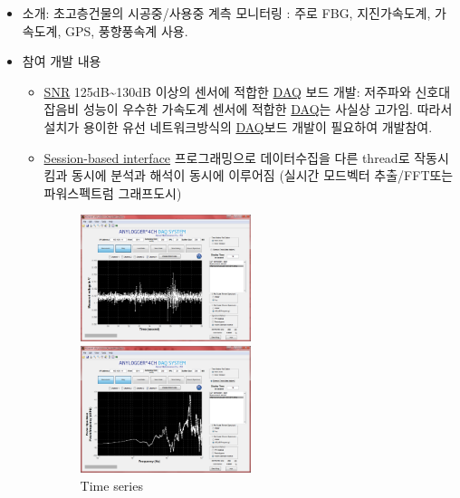 \begin{itemize}
	\item 소개: 초고층건물의 시공중/사용중 계측 모니터링 : 주로 FBG, 지진가속도계, 가속도계, GPS, 풍향풍속계 사용.
	\item 참여 개발 내용
	      \begin{itemize}
		      \item \href{https://en.wikipedia.org/wiki/Signal-to-noise_ratio}{SNR} 125dB\textasciitilde{}130dB 이상의 센서에 적합한 \href{https://en.wikipedia.org/wiki/Data_acquisition}{DAQ} 보드 개발: 저주파와 신호대잡음비 성능이 우수한 가속도계 센서에 적합한 \href{https://en.wikipedia.org/wiki/Data_acquisition}{DAQ}는 사실상 고가임. 따라서 설치가 용이한 유선 네트워크방식의 \href{https://en.wikipedia.org/wiki/Data_acquisition}{DAQ}보드 개발이 필요하여 개발참여.
		      \item \href{http://kr.mathworks.com/help/daq/examples/getting-started-with-session-based-interface-using-ni-devices.html}{Session-based interface} 프로그래밍으로 데이터수집을 다른 thread로 작동시킴과 동시에 분석과 해석이 동시에 이루어짐 (실시간 모드벡터 추출/FFT또는 파워스펙트럼 그래프도시)
		            \begin{figure}[ht]
			            \begin{fullwidth}
				            \parbox{0.5\textwidth}{
					            \includegraphics[width=0.5\textwidth] {images/SW1.JPG}
					            \caption*{Time series}
				            }\qquad
				            \parbox{0.5\textwidth}{
					            \includegraphics[width=0.5\textwidth] {images/SW2.JPG}
}
\end{fullwidth}
\end{figure}
\end{itemize}
\end{itemize}
